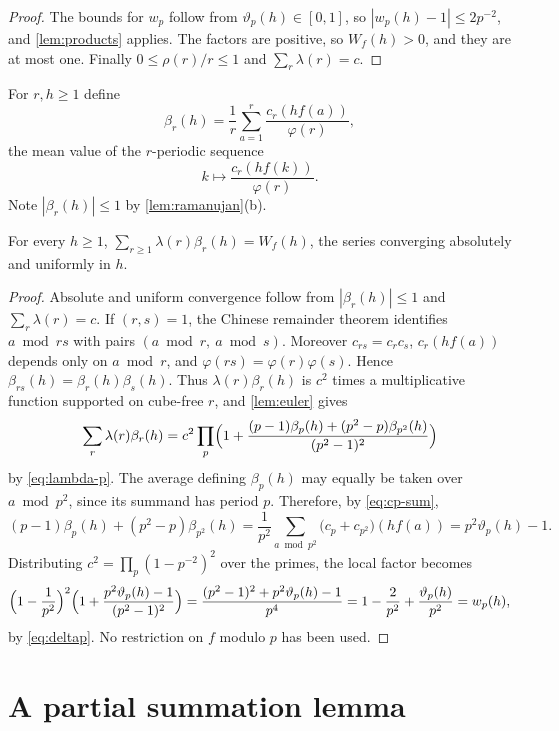 \begin{proof}
The bounds for $w_p$ follow from $\vartheta_p(h)\in[0,1]$, so $|w_p(h)-1|\le2p^{-2}$, and \cref{lem:products} applies. The factors are positive, so $W_f(h)>0$, and they are at most one. Finally $0\le\rho(r)/r\le1$ and $\sum_r\lambda(r)=c$.
\end{proof}

For $r,h\ge1$ define
\begin{equation}\label{eq:beta}
\beta_r(h)=\frac1r\sum_{a=1}^r\frac{c_r(hf(a))}{\varphi(r)},
\end{equation}
the mean value of the $r$-periodic sequence
\[
k\longmapsto\frac{c_r(hf(k))}{\varphi(r)}.
\]
Note $|\beta_r(h)|\le1$ by \cref{lem:ramanujan}(b).

\begin{lemma}\label{lem:W-ident}
For every $h\ge1$, $\sum_{r\ge1}\lambda(r)\beta_r(h)=W_f(h)$, the series converging absolutely and uniformly in $h$.
\end{lemma}

\begin{proof}
Absolute and uniform convergence follow from $|\beta_r(h)|\le1$ and $\sum_r\lambda(r)=c$. If $(r,s)=1$, the Chinese remainder theorem identifies $a\bmod rs$ with pairs $(a\bmod r,\ a\bmod s)$. Moreover $c_{rs}=c_rc_s$, $c_r(hf(a))$ depends only on $a\bmod r$, and $\varphi(rs)=\varphi(r)\varphi(s)$. Hence $\beta_{rs}(h)=\beta_r(h)\beta_s(h)$. Thus $\lambda(r)\beta_r(h)$ is $c^2$ times a multiplicative function supported on cube-free $r$, and \cref{lem:euler} gives
\[
\sum_r\lambda(r)\beta_r(h)=c^2\prod_p\Bigl(1+\frac{(p-1)\beta_p(h)+(p^2-p)\beta_{p^2}(h)}{(p^2-1)^2}\Bigr)
\]
by \eqref{eq:lambda-p}. The average defining $\beta_p(h)$ may equally be taken over $a\bmod p^2$, since its summand has period $p$. Therefore, by \eqref{eq:cp-sum},
\[
(p-1)\beta_p(h)+(p^2-p)\beta_{p^2}(h)=\frac1{p^2}\sum_{a\bmod p^2}\bigl(c_p+c_{p^2}\bigr)(hf(a))=p^2\vartheta_p(h)-1.
\]
Distributing $c^2=\prod_p(1-p^{-2})^2$ over the primes, the local factor becomes
\[
\Bigl(1-\frac1{p^2}\Bigr)^2\Bigl(1+\frac{p^2\vartheta_p(h)-1}{(p^2-1)^2}\Bigr)=\frac{(p^2-1)^2+p^2\vartheta_p(h)-1}{p^4}=1-\frac2{p^2}+\frac{\vartheta_p(h)}{p^2}=w_p(h),
\]
by \eqref{eq:deltap}. No restriction on $f$ modulo $p$ has been used.
\end{proof}

\section{A partial summation lemma}

